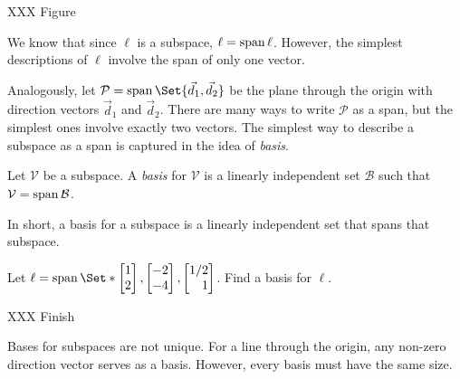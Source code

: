 	XXX Figure

	We know that since $\ell$ is a subspace, $\ell=\operatorname{span}\ell$. However,
	the simplest descriptions of $\ell$ involve the span of only one vector.


	Analogously, let $\mathcal P=\Span\Set{\vec d_1,\vec d_2}$ be the plane
	through the origin with direction vectors $\vec d_1$ and $\vec d_2$. There
	are many ways to write $\mathcal P$ as a span, but the simplest ones
	involve exactly two vectors. The simplest way to describe a subspace
	as a span is captured in the idea of \emph{basis}.

	\begin{definition}[Basis]
		Let $\mathcal V$ be a subspace. A \emph{basis} for 
		$\mathcal V$ is a linearly independent set $\mathcal B$
		such that $\mathcal V=\operatorname{span}\mathcal B$.
	\end{definition}

	In short, a basis for a subspace is a linearly independent set that spans that
	subspace.

	\begin{example}
		\label{EXLINEBASIS}
		Let $\ell=\Span\Set*{\mat{1\\2},\mat{-2\\-4}, \mat{1/2\\1}}$. Find
		a basis for $\ell$.

		XXX Finish
	\end{example}

	Bases for subspaces are not unique. For a line through the origin, 
	any non-zero direction vector serves as a basis. However, every basis
	must have the same size.

